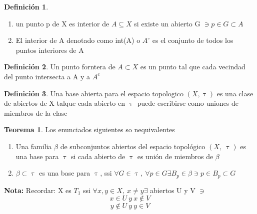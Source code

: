 \documentclass{article}
\theoremstyle{definition}
\newtheorem{definition}{Definición}[section]
\newtheorem{theorem}{Teorema}[section]
\begin{document}
\begin{definition}
	\begin{enumerate}
		\item un punto p de X es interior de $A\subseteq X$ si existe un abierto G $\ni p\in G\subset A$
		\item El interior de A denotado como int(A) o $A^{\circ}$ es el conjunto de todos los puntos interiores de A
	\end{enumerate}
\end{definition}
\begin{definition}
	Un punto forntera de $A\subset X$ es un punto tal que cada vecindad del punto intersecta a A y a $A^c$
\end{definition}
\begin{definition}
	Una base abierta para el espacio topologico $(X,\uptau)$ es una clase de abiertos de X talque cada abierto en $\uptau$ puede escribirse como uniones de miembros de la clase
\end{definition}
\begin{theorem}
	Los enunciados siguientes so nequivalentes
	\begin{enumerate}
		\item Una familia $\beta$ de subconjuntos abiertos del espacio topológico $(X,\ \uptau)$ es una base para $\uptau$ si cada abierto de $\uptau$ es unión de miembros de $\beta$
		\item $\beta\subset\uptau$ es una base para $\uptau$, ssi $\forall G\in \uptau,\ \forall p\in G \exists B_p\in\beta\ni p\in B_p\subset G$ 
	\end{enumerate}
\end{theorem}





\textbf{Nota: } Recordar: X es $T_1$ ssi $\forall x,y\in X,\ x\neq y\exists$ abiertos U y V $\ni$
	\[x\in U \ y \ x\not\in V\]
	\[y\not\in U \ y \ y\in V\]




\newpage
\end{document}
